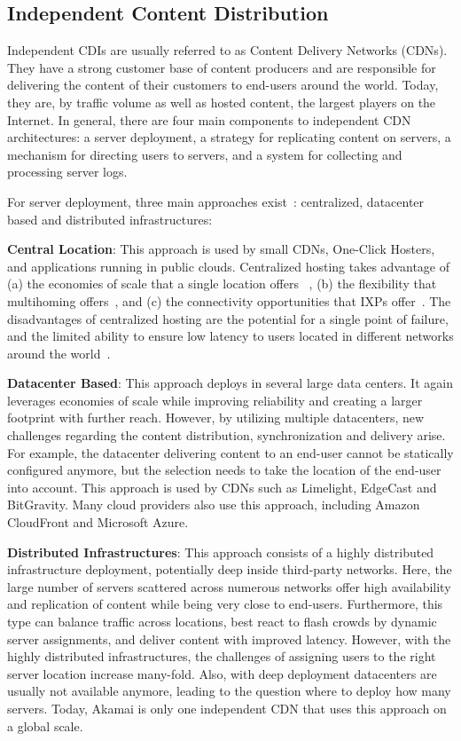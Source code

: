 \subsection{Independent Content Distribution}

Independent CDIs are usually referred to as Content Delivery Networks (CDNs).
They have a strong customer base of content producers and are responsible for
delivering the content of their customers to end-users around the world.
Today, they are, by traffic volume as well as hosted content, the largest
players on the Internet. In general, there are four main components to
independent CDN architectures: a server deployment, a strategy for replicating
content on servers, a mechanism for directing users to servers, and a system
for collecting and processing server logs.

For server deployment, three main approaches
exist~\cite{ImprovingPerformanceInternet2009}: centralized, datacenter based
and distributed infrastructures:

\textbf{Central Location}: This approach is used by small CDNs, One-Click
Hosters, and applications running in public clouds. Centralized hosting takes
advantage of (a) the economies of scale that a single location offers~
\cite{aboveclouds}, (b) the flexibility that multihoming
offers~\cite{Optimizing:Goldenberg2004}, and (c) the connectivity opportunities
that IXPs offer~\cite{IXPSIGCOMM2012}. The disadvantages of centralized hosting
are the potential for a single point of failure, and the limited ability to
ensure low latency to users located in different networks around the
world~\cite {CloudCmp}.

\textbf{Datacenter Based}: This approach deploys in several large data centers.
It again leverages economies of scale while improving reliability and creating
a larger footprint with further reach. However, by utilizing multiple
datacenters, new challenges regarding the content distribution, synchronization
and delivery arise. For example, the datacenter delivering content to an
end-user cannot be statically configured anymore, but the selection needs to
take the location of the end-user into account. This approach is used by CDNs
such as Limelight, EdgeCast and BitGravity. Many cloud providers also use this
approach, including Amazon CloudFront and Microsoft Azure.

\textbf{Distributed Infrastructures}: This approach consists of a highly
distributed infrastructure deployment, potentially deep inside third-party
networks. Here, the large number of servers scattered across numerous networks
offer high availability and replication of content while being very close to
end-users. Furthermore, this type can balance traffic across locations, best
react to flash crowds by dynamic server assignments, and deliver content with
improved latency. However, with the highly distributed infrastructures, the
challenges of assigning users to the right server location increase many-fold.
Also, with deep deployment datacenters are usually not available anymore,
leading to the question where to deploy how many servers. Today, Akamai is only
one independent CDN that uses this approach on a global scale.

